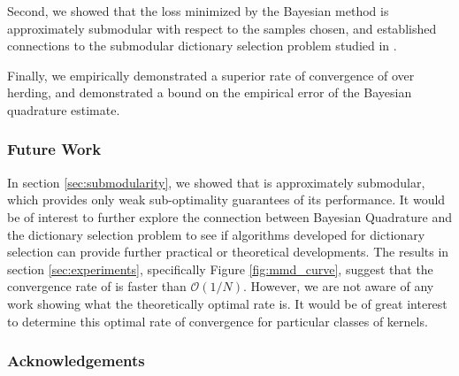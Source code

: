 Second, we showed that the loss minimized by the Bayesian method is approximately submodular with respect to the samples chosen, and established connections to the submodular dictionary selection problem studied in \citep{KrauseCevher10}.

Finally, we empirically demonstrated a superior rate of convergence of \sbq{} over herding, and demonstrated a bound on the empirical error of the Bayesian quadrature estimate.

\subsubsection{Future Work}

In section \ref{sec:submodularity}, we showed that \sbq{} is approximately submodular, which provides only weak sub-optimality guarantees of its performance. It would be of interest to further explore the connection between Bayesian Quadrature and the dictionary selection problem to see if algorithms developed for dictionary selection can provide further practical or theoretical developments. The results in section \ref{sec:experiments}, specifically Figure \ref{fig:mmd_curve}, suggest that the convergence rate of \sbq{} is faster than $\mathcal{O}(1/N)$. However, we are not aware of any work showing what the theoretically optimal rate is. It would be of great interest to determine this optimal rate of convergence for particular classes of kernels.

\subsubsection*{Acknowledgements}


